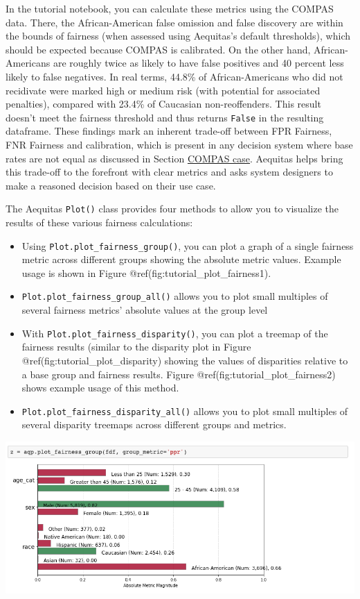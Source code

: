 \documentclass[]{krantz}
\begin{document}
In the tutorial notebook, you can calculate these metrics using the
COMPAS data. There, the African-American false omission and false
discovery are within the bounds of fairness (when assessed using
Aequitas's default thresholds), which should be expected because COMPAS
is calibrated. On the other hand, African-Americans are roughly twice as
likely to have false positives and 40 percent less likely to false
negatives. In real terms, 44.8\% of African-Americans who did not
recidivate were marked high or medium risk (with potential for
associated penalties), compared with 23.4\% of Caucasian
non-reoffenders. This result doesn't meet the fairness threshold and
thus returns \texttt{False} in the resulting dataframe. These findings
mark an inherent trade-off between FPR Fairness, FNR Fairness and
calibration, which is present in any decision system where base rates
are not equal as discussed in Section
\protect\hyperlink{sec:compascase}{COMPAS case}. Aequitas helps bring
this trade-off to the forefront with clear metrics and asks system
designers to make a reasoned decision based on their use case.

The Aequitas \texttt{Plot()} class provides four methods to allow you to
visualize the results of these various fairness calculations:

\begin{itemize}
\item
  Using \texttt{Plot.plot\_fairness\_group()}, you can plot a graph of a
  single fairness metric across different groups showing the absolute
  metric values. Example usage is shown in Figure
  @ref(fig:tutorial\_plot\_fairness1).
\item
  \texttt{Plot.plot\_fairness\_group\_all()} allows you to plot small
  multiples of several fairness metrics' absolute values at the group
  level
\item
  With \texttt{Plot.plot\_fairness\_disparity()}, you can plot a treemap
  of the fairness results (similar to the disparity plot in Figure
  @ref(fig:tutorial\_plot\_disparity) showing the values of disparities
  relative to a base group and fairness results. Figure
  @ref(fig:tutorial\_plot\_fairness2) shows example usage of this
  method.
\item
  \texttt{Plot.plot\_fairness\_disparity\_all()} allows you to plot
  small multiples of several disparity treemaps across different groups
  and metrics.
\end{itemize}

\begin{center}\includegraphics[width=1\linewidth]{ChapterBias/figures/tutorial_plot_fairness1} \end{center}
\end{document}
